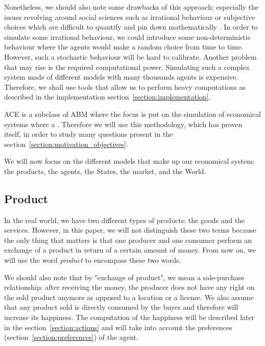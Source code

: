 \documentclass[12pt]{article}
\begin{document}
Nonetheless, we should also note some drawbacks of this approach; especially the issues revolving around social sciences such as irrational behaviour or subjective choices which are difficult to quantify and pin down mathematically \cite{ABM}. In order to simulate some irrational behaviour, we could introduce some non-deterministic behaviour where the agents would make a random choice from time to time. However, such a stochastic behaviour will be hard to calibrate. 
Another problem that may rise is the required computational power. Simulating such a complex system made of different models with many thousands agents is expensive. Therefore, we shall use tools that allow us to perform heavy computations as described in the implementation section~\ref{section:implementation}. 

ACE is a subclass of ABM where the focus is put on the simulation of economical systems where a \cite{tesfatsion_complex_adaptive_systems}. Therefore we will use this methodology, which has proven itself, in order to study many questions present in the  section~\ref{section:motivation_objectives}.

We will now focus on the different models that make up our economical system: the products, the agents, the States, the market, and the World.

\subsection{Product}\label{section:product}
In the real world, we have two different types of products: the goods and the services. However, in this paper, we will not distinguish these two terms because the only thing that matters is that one producer and one consumer perform an exchange of a product in return of a certain amount of money. From now on, we will use the word \emph{product} to encompass these two words.

We should also note that by "exchange of product", we mean a sale-purchase relationship: after receiving the money, the producer does not have any right on the sold product anymore as opposed to a location or a license. We also assume that any product sold is directly consumed by the buyer and therefore will increase its happiness. The computation of the happiness will be described later in the section~\ref{section:actions} and will take into account the preferences (section~\ref{section:preferences}) of the agent.
\end{document}
